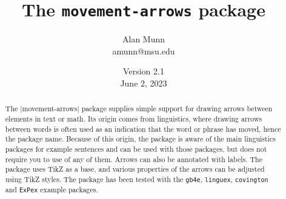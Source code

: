 \documentclass[11pt]{article}
\title{The \texttt{movement-arrows} package}
\author{Alan Munn\\amunn@msu.edu}
\date{Version 2.1\\June 2, 2023}
\newcommand*{\pkg}[1]{\texttt{#1}}
\begin{document}
\maketitle
\thispagestyle{empty}
\begin{abstract}{\noindent
The |movement-arrows| package supplies simple support for drawing  arrows between elements in text or math. Its origin comes from linguistics, where drawing arrows between words is often used as an indication that the word or phrase has moved, hence the package name.  Because of this origin, the package is aware of the main linguistics packages for example sentences and can be used with those packages, but does not require you to use of any of them.  Arrows can also be annotated with labels.  The package uses TikZ as a base, and various properties of the arrows can be adjusted using TikZ styles. The package has been tested with the \pkg{gb4e}, \pkg{linguex}, \pkg{covington} and \pkg{ExPex} example packages.
}
\end{abstract}
\end{document}
